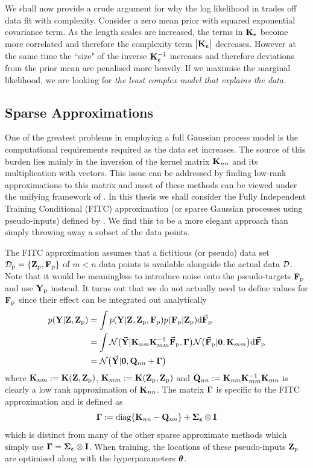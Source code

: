 We shall now provide a crude argument for why the log likelihood in  trades off data fit with complexity. Consider a zero mean prior with squared exponential covariance term. As the length scales are increased, the terms in $\mathbf{K}_{\boldsymbol{\epsilon}}$ become more correlated and therefore the complexity term $\big|\mathbf{K}_{\boldsymbol{\epsilon}}\big|$ decreases. However at the same time the ``size" of the inverse $\mathbf{K}_{\boldsymbol{\epsilon}}^{-1}$ increases and therefore deviations from the prior mean are penalised more heavily. If we maximise the marginal likelihood, we are looking for \textit{the least complex model that explains the data.}





\subsection{Sparse Approximations} \label{sec:sparse}
One of the greatest problems in employing a full Gaussian process model is the computational requirements required as the data set increases. The source of this burden lies mainly in the inversion of the kernel matrix $\mathbf{K}_{nn}$ and its multiplication with vectors. This issue can be addressed by finding low-rank approximations to this matrix and most of these methods can be viewed under the unifying framework of \cite{QR05}. In this thesis we shall consider the Fully Independent Training Conditional (FITC) approximation (or sparse Gaussian processes using pseudo-inputs) defined by \cite{SG06}. We find this to be a more elegant approach than simply throwing away a subset of the data points.

The FITC approximation assumes that a fictitious (or pseudo) data set $\mathcal{D}_{\text{p}} = \{\mathbf{Z}_{\text{p}},\mathbf{F}_{\text{p}}\}$ of $m<n$ data points is available alongside the actual data $\mathcal{D}$. Note that it would be meaningless to introduce noise onto the pseudo-targets $\mathbf{F}_{\text{p}}$ and use $\mathbf{Y}_{\text{p}}$ instead. It turns out that we do not actually need to define values for $\mathbf{F}_{\text{p}}$ since their effect can be integrated out analytically
\begin{align*}
p(\mathbf{Y} | \mathbf{Z}, \mathbf{Z}_{\text{p}}) &= \int p(\mathbf{Y} | \mathbf{Z}, \mathbf{Z}_{\text{p}}, \mathbf{F}_{\text{p}}) p(\mathbf{F}_{\text{p}} | \mathbf{Z}_{\text{p}}) \mathrm{d} \vec{\mathbf{F}}_{\text{p}} \\
&= \int \mathcal{N}\big(\vec{\mathbf{Y}} | \mathbf{K}_{nm}\mathbf{K}_{mm}^{-1}\vec{\mathbf{F}}_{\text{p}}, \boldsymbol{\Gamma}\big) 
\mathcal{N}\big(\vec{\mathbf{F}}_{\text{p}} | \mathbf{0}, \mathbf{K}_{mm}\big) \mathrm{d} \vec{\mathbf{F}}_{\text{p}} \\
&= \mathcal{N}\big( \vec{\mathbf{Y}}| \mathbf{0}, \mathbf{Q}_{nn} + \boldsymbol{\Gamma} \big)
\end{align*}
where $\mathbf{K}_{nm} := \mathbf{K}(\mathbf{Z},\mathbf{Z}_{\text{p}})$, $\mathbf{K}_{mm} := \mathbf{K}(\mathbf{Z}_{\text{p}},\mathbf{Z}_{\text{p}})$ and $\mathbf{Q}_{nn} := \mathbf{K}_{nm}\mathbf{K}_{mm}^{-1}\mathbf{K}_{mn}$ is clearly a low rank approximation of $\mathbf{K}_{nn}$. The matrix $\boldsymbol{\Gamma}$ is specific to the FITC approximation and is defined as
\begin{equation*}
\boldsymbol{\Gamma} := \mathrm{diag}\{\mathbf{K}_{nn} - \mathbf{Q}_{nn}\} + \boldsymbol{\Sigma}_{\boldsymbol{\epsilon}} \otimes \mathbf{I}
\end{equation*}
which is distinct from many of the other sparse approximate methods which simply use $\boldsymbol{\Gamma} = \boldsymbol{\Sigma}_{\boldsymbol{\epsilon}} \otimes \mathbf{I}$. When training, the locations of these pseudo-inputs $\mathbf{Z}_{\text{p}}$ are optimised along with the hyperparameters $\boldsymbol{\theta}$.

